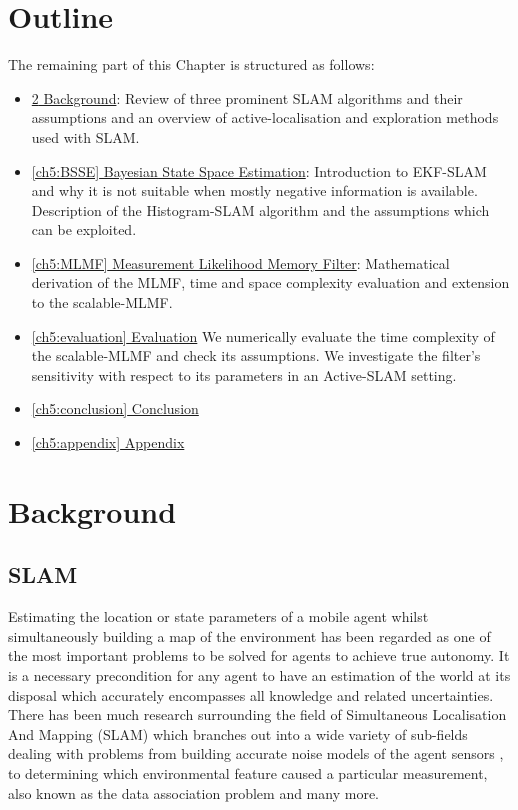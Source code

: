 \section{Outline}


The remaining part of this Chapter is structured as follows:


\begin{itemize}
 \item \hyperref[ch5:background]{\ref{ch5:background} Background}: Review of three prominent SLAM algorithms
 and their assumptions and an overview of active-localisation and exploration methods used with SLAM.
 \item \hyperref[ch5:BSSE]{\ref{ch5:BSSE} Bayesian State Space Estimation}:  Introduction to EKF-SLAM and why it 
  is not suitable when mostly negative information is available. Description 
 of the Histogram-SLAM algorithm and the assumptions which can be exploited.
 \item \hyperref[ch5:MLMF]{\ref{ch5:MLMF} Measurement Likelihood Memory Filter}:
 Mathematical derivation of the MLMF, time and space complexity evaluation and extension to 
 the scalable-MLMF.
 \item \hyperref[ch5:evaluation]{\ref{ch5:evaluation} Evaluation}
 We numerically evaluate the time complexity of the scalable-MLMF and check its assumptions.
 We investigate the filter's sensitivity with respect to its parameters in an Active-SLAM setting.
 \item \hyperref[ch5:conclusion]{\ref{ch5:conclusion} Conclusion}
 \item \hyperref[ch5:appendix]{\ref{ch5:appendix} Appendix}
\end{itemize}

\section{Background}\label{ch5:background}

\subsection{SLAM}

Estimating the location or state parameters of a mobile agent whilst simultaneously building a map of the environment has been
regarded as one of the most important problems to be solved for agents to achieve true autonomy. It is a necessary precondition for 
any agent to have an estimation of the world at its disposal which accurately encompasses all knowledge and related uncertainties. 
There has been much research surrounding the field of Simultaneous Localisation And Mapping (SLAM) which branches out into a wide variety of sub-fields 
dealing with problems from building accurate noise models of the agent sensors \cite{Plagemann07gaussianbeam}, to determining which environmental 
feature caused a particular measurement, also known as the data association problem \cite{DataAssociation2003} and many more. 

